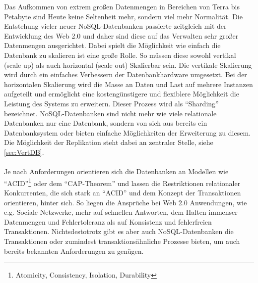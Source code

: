 \documentclass[a4paper,11pt,oneside,%
headsepline,												%
footsepline,												%
bibtotocnumbered									%
]{scrreprt}
\begin{document}
Das Aufkommen von extrem großen Datenmengen in Bereichen von Terra bis Petabyte sind Heute keine Seltenheit mehr, sondern viel mehr Normalität. Die Entstehung vieler neuer NoSQL-Datenbanken passierte zeitgleich mit der Entwicklung des Web 2.0 und daher sind diese auf das Verwalten sehr großer Datenmengen ausgerichtet.
Dabei spielt die Möglichkeit wie einfach die Datenbank zu skalieren ist eine große Rolle. So müssen diese sowohl vertikal (scale up) als auch horizontal (scale out) Skalierbar sein. Die vertikale Skalierung wird durch ein einfaches Verbessern der Datenbankhardware umgesetzt. Bei der horizontalen Skalierung wird die Masse an Daten und Last auf mehrere Instanzen aufgeteilt und ermöglicht eine kostengünstigere und flexiblere Möglichkeit die Leistung des Systems zu erweitern. Dieser Prozess wird als \enquote{Sharding} bezeichnet.
NoSQL-Datenbanken sind nicht mehr wie viele relationale Datenbanken nur eine Datenbank, sondern von sich aus bereits ein Datenbanksystem oder bieten einfache Möglichkeiten der Erweiterung zu diesem. Die Möglichkeit der Replikation steht dabei an zentraler Stelle, siehe \autoref{sec:VertDB}.\\\\
Je nach Anforderungen orientieren sich die Datenbanken an Modellen wie \enquote{ACID}\footnote{Atomicity, Consistency, Isolation, Durability} oder dem \enquote{CAP-Theorem} und lassen die Restriktionen relationaler Konkurrenten, die sich stark an \enquote{ACID} und dem Konzept der Transaktionen orientieren, hinter sich. So liegen die Ansprüche bei Web 2.0 Anwendungen, wie e.g. Sociale Netzwerke, mehr auf schnellen Antworten, dem Halten immenser Datenmengen und Fehlertoleranz als auf Konsistenz und fehlerfreien Transaktionen.
Nichtsdestotrotz gibt es aber auch NoSQL-Datenbanken die Transaktionen oder  zumindest transaktionsähnliche Prozesse bieten, um auch bereits bekannten Anforderungen zu genügen.
\end{document}
